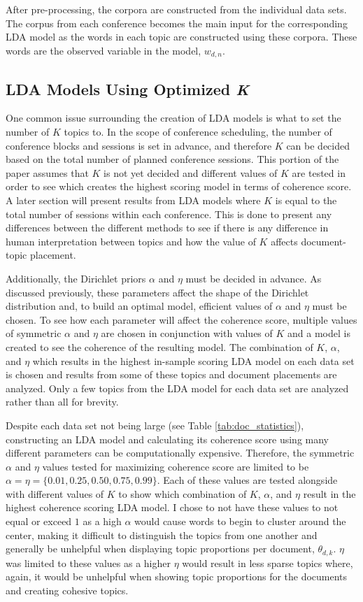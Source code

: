 \documentclass[a4paper, 12pt, twoside]{article}
\numberwithin{equation}{section} %
\begin{document}
After pre-processing, the corpora are constructed from the individual data sets. The corpus from each conference becomes the main input for the corresponding LDA model as the words in each topic are constructed using these corpora. These words are the observed variable in the model, $w_{d,n}$. 

\subsection{LDA Models Using Optimized \textit{K}}

One common issue surrounding the creation of LDA models is what to set the number of $K$ topics to. In the scope of conference scheduling, the number of conference blocks and sessions is set in advance, and therefore $K$ can be decided based on the total number of planned conference sessions. This portion of the paper assumes that $K$ is not yet decided and different values of $K$ are tested in order to see which creates the highest scoring model in terms of coherence score. A later section will present results from LDA models where $K$ is equal to the total number of sessions within each conference. This is done to present any differences between the different methods to see if there is any difference in human interpretation between topics and how the value of $K$ affects document-topic placement.

Additionally, the Dirichlet priors $\alpha$ and $\eta$ must be decided in advance. As discussed previously, these parameters affect the shape of the Dirichlet distribution and, to build an optimal model, efficient values of $\alpha$ and $\eta$ must be chosen. To see how each parameter will affect the coherence score, multiple values of symmetric $\alpha$ and $\eta$ are chosen in conjunction with values of $K$ and a model is created to see the coherence of the resulting model. The combination of $K$, $\alpha$, and $\eta$ which results in the highest in-sample scoring LDA model on each data set is chosen and results from some of these topics and document placements are analyzed. Only a few topics from the LDA model for each data set are analyzed rather than all for brevity. 

Despite each data set not being large (see Table \ref{tab:doc_statistics}), constructing an LDA model and calculating its coherence score using many different parameters can be computationally expensive. Therefore, the symmetric $\alpha$ and $\eta$ values tested for maximizing coherence score are limited to be $\alpha = \eta = \{0.01, 0.25, 0.50, 0.75, 0.99\}$. Each of these values are tested alongside with different values of $K$ to show which combination of $K$, $\alpha$, and $\eta$ result in the highest coherence scoring LDA model. I chose to not have these values to not equal or exceed $1$ as a high $\alpha$ would cause words to begin to cluster around the center, making it difficult to distinguish the topics from one another and generally be unhelpful when displaying topic proportions per document, $\theta_{d,k}$. $\eta$ was limited to these values as a higher $\eta$ would result in less sparse topics where, again, it would be unhelpful when showing topic proportions for the documents and creating cohesive topics. 
\end{document}
